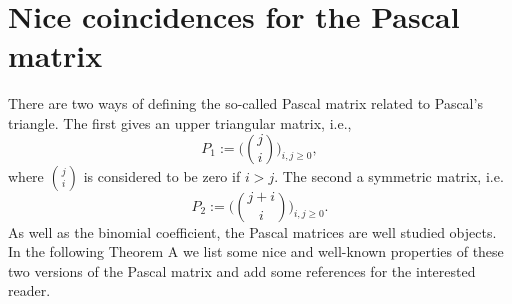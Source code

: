\documentclass{article}
\begin{document}
\section{Nice coincidences for the Pascal matrix}\label{sec:2}




There are two ways of defining the so-called Pascal matrix related to Pascal's triangle. The first gives an upper triangular matrix, i.e.,
$$P_1:=\Big(\binom{j}{i}\Big)_{i,j\geq 0},$$ 
where $\binom{j}{i}$ is considered to be zero if $i>j$. 
The second a symmetric matrix, i.e. 
$$P_2:=\Big(\binom{j+i}{i}\Big)_{i,j\geq 0}.$$
As well as the binomial coefficient, the Pascal matrices are well studied objects. 
In the following Theorem A we list some nice and well-known properties of these two versions of the Pascal matrix and add some references for the interested reader. 
\end{document}
